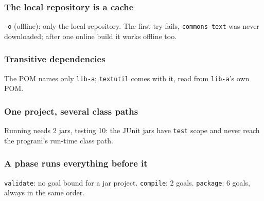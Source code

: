 \documentclass[aspectratio=169,10pt,compress]{beamer}
\begin{document}
\begin{frame}[t,fragile] \frametitle{The local repository is a cache}

  \vspace{0.1em}
  \small
  \texttt{-o} (offline): only the local repository. The first try fails, \texttt{commons-text} was never downloaded; after one online build it works offline too.
\end{frame}





\begin{frame}[t,fragile] \frametitle{Transitive dependencies}

  \vspace{0.1em}
  \small
  The POM names only \texttt{lib-a}; \texttt{textutil} comes with it, read from \texttt{lib-a}'s own POM.
\end{frame}




\begin{frame}[t,fragile] \frametitle{One project, several class paths}

  \vspace{0.1em}
  \small
  Running needs 2 jars, testing 10: the JUnit jars have \texttt{test} scope and never reach the program's run-time class path.
\end{frame}





\begin{frame}[t,fragile] \frametitle{A phase runs everything before it}

  \vspace{0.1em}
  \small
  \texttt{validate}: no goal bound for a jar project. \texttt{compile}: 2 goals. \texttt{package}: 6 goals, always in the same order.
\end{frame}
\end{document}
